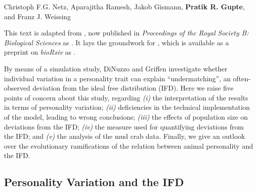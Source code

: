 
\pagestyle{plain}

\begingroup

\let\clearpage\relax
\let\cleardoublepage\relax
\let\cleardoublepage\relax

\begin{interludeenv}

\renewcommand\thefigure{\theinterludes-\arabic{figure}}
\setcounter{figure}{0}
\setcounter{footnote}{0}


\label{box:details}

	\noindent Christoph F.G. Netz, Aparajitha Ramesh, Jakob Gismann, \textbf{Pratik R. Gupte}, and Franz J. Weissing

	\medskip

	\noindent {\large{$\Delta$}} {This text is adapted from \citet{netz2022}, now published in \textit{Proceedings of the Royal Society B: Biological Sciences} as .
	It lays the groundwork for \textcite{netz2022b}, which is available as a preprint on \textit{bioRxiv} as .
	}

	\medskip

	By means of a simulation study, DiNuzzo and Griffen  investigate whether individual variation in a personality trait can explain ``undermatching'', an often-observed deviation from the ideal free distribution (IFD). 
	Here we raise five points of concern about this study, regarding \emph{(i)} the interpretation of the results in terms of personality variation; \emph{(ii)} deficiencies in the technical implementation of the model, leading to wrong conclusions; \emph{(iii)} the effects of population size on deviations from the IFD; \emph{(iv)} the measure used for quantifying deviations from the IFD; and \emph{(v)} the analysis of the mud crab data. 
	Finally, we give an outlook over the evolutionary ramifications of the relation between animal personality and the IFD.
	
	\subsection*{Personality Variation and the IFD}
	

\end{interludeenv}
